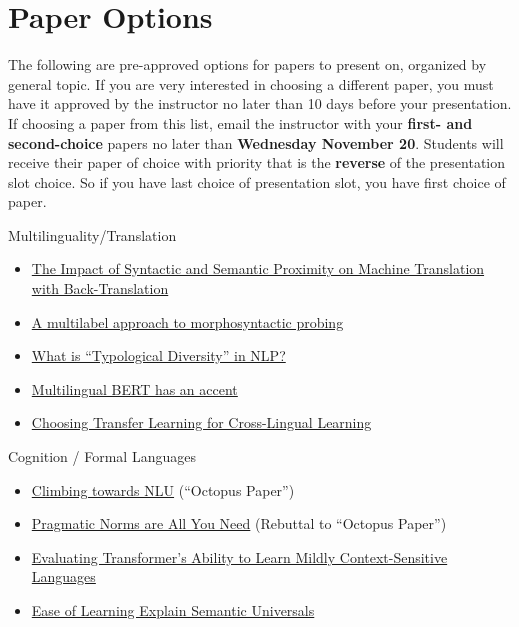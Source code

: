 \documentclass[11pt]{article}
\begin{document}
\section*{Paper Options}
The following are pre-approved options for papers to present on, organized by general topic. If you are very interested in choosing a different paper, you must have it approved by the instructor no later than 10 days before your presentation. If choosing a paper from this list, email the instructor with your \textbf{first- and second-choice} papers no later than \textbf{Wednesday November 20}. Students will receive their paper of choice with priority that is the \textbf{reverse} of the presentation slot choice. So if you have last choice of presentation slot, you have first choice of paper.

Multilinguality/Translation
\begin{itemize}
 \item \href{https://arxiv.org/abs/2403.18031}{The Impact of Syntactic and Semantic Proximity on Machine Translation with Back-Translation}
 \item \href{https://aclanthology.org/2021.findings-emnlp.382/}{A multilabel approach to morphosyntactic probing}
 \item \href{https://aclanthology.org/2024.emnlp-main.326/}{What is ``Typological Diversity'' in NLP?}
 \item \href{https://aclanthology.org/2023.findings-eacl.89/}{Multilingual BERT has an accent}
 \item \href{https://aclanthology.org/P19-1301/}{Choosing Transfer Learning for Cross-Lingual Learning}
\end{itemize}

Cognition / Formal Languages
\begin{itemize}
  \item \href{https://aclanthology.org/2020.acl-main.463/}{Climbing towards NLU} (``Octopus Paper'')
  \item \href{https://aclanthology.org/2024.emnlp-main.651/}{Pragmatic Norms are All You Need} (Rebuttal to ``Octopus Paper'')
  \item \href{https://aclanthology.org/2023.blackboxnlp-1.21/}{Evaluating Transformer's Ability to Learn Mildly Context-Sensitive Languages}
  \item \href{https://www.sciencedirect.com/science/article/pii/S0010027719302495}{Ease of Learning Explain Semantic Universals}
\end{itemize}
\end{document}
